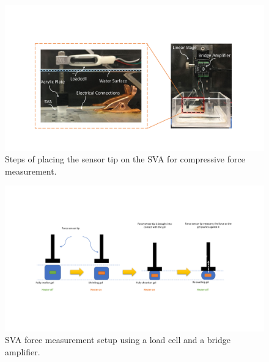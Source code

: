 \begin{figure}[h]
      \centering
      \includegraphics[width=\textwidth]{forceTestSetup.pdf}
      \caption{Steps of placing the sensor tip on the SVA for compressive force measurement.}
      \label{fig:forceTestSetup}
\end{figure}

\begin{figure}[!h]
      \centering
      \includegraphics[width=\textwidth]{forceProcedure.pdf}
      \caption{SVA force measurement setup using a load cell and a bridge amplifier.}
      \label{fig:forceProcedure}
\end{figure}

